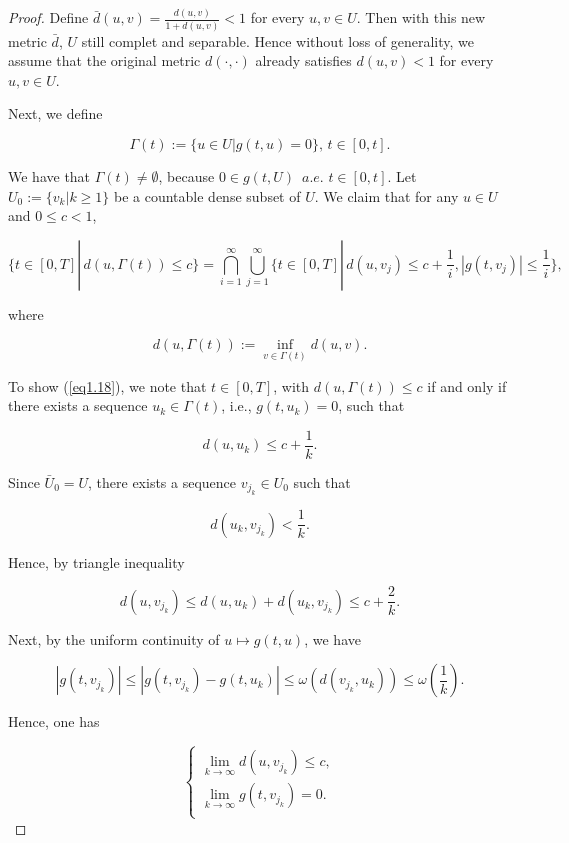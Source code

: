 \begin{proof}
Define $\bar{d}(u,v)=\frac{d(u,v)}{1+d(u,v)}<1$ for every $u,v\in U$. Then with this new metric $\bar{d}$, $U$ still complet and separable. Hence without loss of generality, we assume that the original metric $d(\cdot,\cdot)$ already satisfies $d(u,v)<1$ for every $u,v \in U$.

Next, we define

\begin{equation*}
\Gamma(t):=\{u\in U | g(t,u)=0\},\, t\in [0,t].
\end{equation*}	

We have that $\Gamma(t)\neq \emptyset$, because $0\in g(t,U)\,\,\,a.e. \,\,t\in [0,t]$. Let $U_0:=\{v_k | k\geq 1\}$ be a countable dense subset of $U$. We claim that for any $u \in U$ and $0\leq c < 1$,

\begin{equation}\label{eq1.18}
\{t\in[0,T] |\, d(u,\Gamma(t))\leq c\}=\bigcap^{\infty}_{i=1}\bigcup^{\infty}_{j=1}\{t\in[0,T] |\, d(u,v_j)\leq c+\frac{1}{i},|g(t,v_j)|\leq \frac{1}{i}\},
\end{equation}

where 

$$d(u,\Gamma (t)):=\inf_{v\in \Gamma(t)}d(u,v).$$

To show (\ref{eq1.18}), we note that $t\in [0,T]$, with $d(u,\Gamma(t))\leq c$ if and only if there exists a sequence $u_k \in \Gamma(t)$, i.e., $g(t,u_k)=0$, such that

$$d(u,u_k)\leq c+\frac{1}{k}.$$

Since $\bar{U}_0=U$, there exists a sequence $v_{j_k} \in U_0$ such that 

$$d(u_k,v_{j_k})<\frac{1}{k}.$$

Hence, by triangle inequality

$$d(u,v_{j_k})\leq d(u,u_k)+d(u_k,v_{j_k})\leq c+\frac{2}{k}.$$

Next, by the uniform continuity of $u\mapsto g(t,u)$, we have

$$|g(t,v_{j_k})|\leq |g(t,v_{j_k})-g(t,u_k)|\leq \omega(d(v_{j_k},u_k))\leq \omega\left(\frac{1}{k}\right).$$

Hence, one has

$$\left\{ \begin{array}{l}
	\lim_{k\rightarrow \infty} d(u,v_{j_k})\leq c, \\
    \lim_{k\rightarrow \infty} g(t,v_{j_k})=0. \\
\end{array}
\right.$$


\end{proof}
